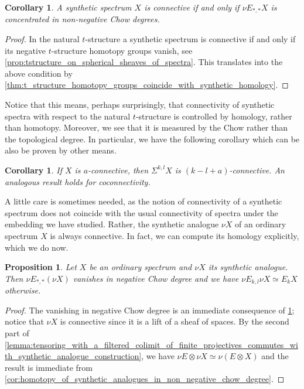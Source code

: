 \documentclass[oneside,a4paper]{amsart}
\theoremstyle{plain}
\newtheorem{prop}[thm]{Proposition}
\newtheorem{cor}[thm]{Corollary}
\theoremstyle{definition}
\theoremstyle{remark}
\begin{document}
\begin{cor}
\label{cor:homological_criterion_of_connectivity}
A synthetic spectrum $X$ is connective if and only if $\nu E_{*, *}X$ is concentrated in non-negative Chow degrees. 
\end{cor}

\begin{proof}
In the natural $t$-structure a synthetic spectrum is connective if and only if its negative $t$-structure homotopy groups vanish, see \cref{prop:tstructure_on_spherical_sheaves_of_spectra}. This translates into the above condition by \cref{thm:t_structure_homotopy_groups_coincide_with_synthetic_homology}. 
\end{proof}
Notice that this means, perhaps surprisingly, that connectivity of synthetic spectra with respect to the natural $t$-structure is controlled by homology, rather than homotopy. Moreover, we see that it is measured by the Chow rather than the topological degree. In particular, we have the following corollary which can be also be proven by other means. 

\begin{cor}
\label{cor:suspension_raises_connectivity_by_chow_degree}
If $X$ is $a$-connective, then $\Sigma^{k, l}X$ is $(k-l+a)$-connective. An analogous result holds for coconnectivity. 
\end{cor}

A little care is sometimes needed, as the notion of connectivity of a synthetic spectrum does not coincide with the usual connectivity of spectra under the embedding we have studied. Rather, the synthetic analogue $\nu X$ of an ordinary spectrum $X$ is always connective. In fact, we can compute its homology explicitly, which we do now.

\begin{prop}
\label{prop:homology_of_synthetic_analogues}
Let $X$ be an ordinary spectrum and $\nu X$ its synthetic analogue. Then $\nu E_{*, *} (\nu X)$ vanishes in negative Chow degree and we have $\nu E_{k, l} \nu X \simeq E_{k} X$ otherwise. 
\end{prop}

\begin{proof}
The vanishing in negative Chow degree is an immediate consequence of \cref{cor:homological_criterion_of_connectivity}; notice that $\nu X$ is connective since it is a lift of a sheaf of spaces. By the second part of \cref{lemma:tensoring_with_a_filtered_colimit_of_finite_projectives_commutes_with_synthetic_analogue_construction}, we have $\nu E \otimes \nu X \simeq \nu (E \otimes X)$ and the result is immediate from \cref{cor:homotopy_of_synthetic_analogues_in_non_negative_chow_degree}. 
\end{proof}
\end{document}
